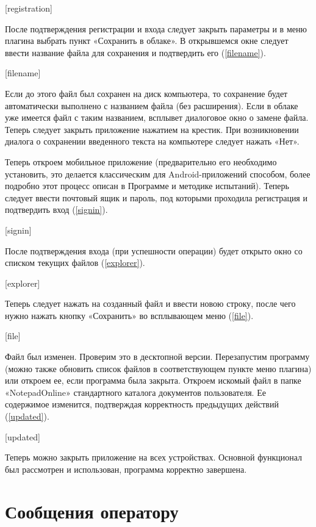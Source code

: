 ﻿\documentclass[opermanual]{espd}
\begin{document}
[registration]

После подтверждения регистрации и входа следует закрыть параметры и в меню плагина выбрать пункт «Сохранить в облаке». В открывшемся окне следует ввести название файла для сохранения и подтвердить его (\ref{filename}).

[filename]

Если до этого файл был сохранен на диск компьютера, то сохранение будет автоматически выполнено с названием файла (без расширения). Если в облаке уже имеется файл с таким названием, всплывет диалоговое окно о замене файла.
Теперь следует закрыть приложение нажатием на крестик. При возникновении диалога о сохранении введенного текста на компьютере следует нажать «Нет».

Теперь откроем мобильное приложение (предварительно его необходимо установить, это делается классическим для Android-приложений способом, более подробно этот процесс описан в Программе и методике испытаний). Теперь следует ввести почтовый ящик и пароль, под которыми проходила регистрация и подтвердить вход (\ref{signin}).

[signin]

После подтверждения входа (при успешности операции) будет открыто окно со списком текущих файлов (\ref{explorer}).

[explorer]

Теперь следует нажать на созданный файл и ввести новою строку, после чего нужно нажать кнопку «Сохранить» во всплывающем меню (\ref{file}).

[file]

Файл был изменен. Проверим это в десктопной версии. Перезапустим программу (можно также обновить список файлов в соответствующем пункте меню плагина) или откроем ее, если программа была закрыта. Откроем искомый файл в папке «NotepadOnline» стандартного каталога документов пользователя. Ее содержимое изменится, подтверждая корректность предыдущих действий (\ref{updated}).

[updated]

Теперь можно закрыть приложение на всех устройствах. Основной функционал был рассмотрен и использован, программа корректно завершена.

\section{Сообщения оператору}
\end{document}
